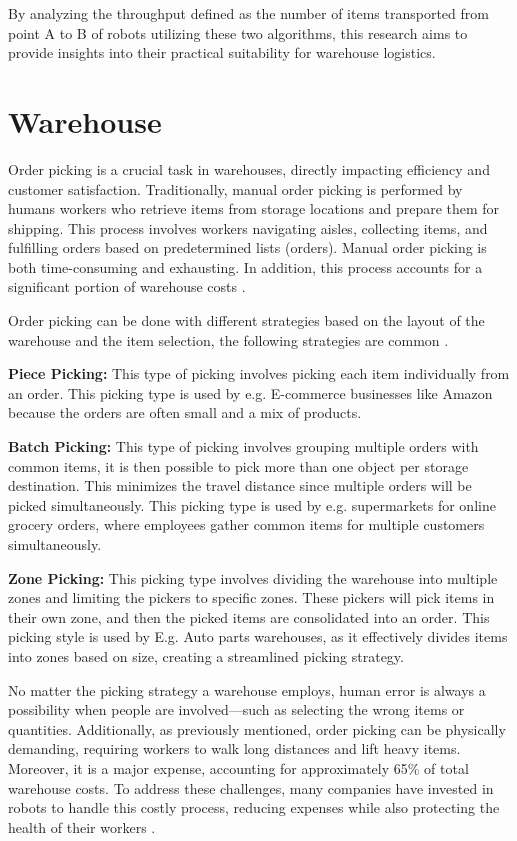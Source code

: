 \documentclass{kththesis}
\begin{document}
By analyzing the throughput defined as the number of items transported from point A to B of robots utilizing these two algorithms, this research aims to provide insights into their practical suitability for warehouse logistics.


\section{Warehouse}
Order picking is a crucial task in warehouses, directly impacting efficiency and customer satisfaction. Traditionally, manual order picking is performed by humans workers who retrieve items from storage locations and prepare them for shipping. This process involves workers navigating aisles, collecting items, and fulfilling orders based on predetermined lists (orders). Manual order picking is both time-consuming and exhausting. In addition, this process accounts for a significant portion of warehouse costs \parencite{Rene}.

Order picking can be done with different strategies based on the layout of the warehouse and the item selection, the following strategies are common \parencite{CognitOps}.

\textbf{Piece Picking:}
This type of picking involves picking each item individually from an order. This picking type is used by e.g. E-commerce businesses like Amazon because the orders are often small and a mix of products.

\textbf{Batch Picking:}
This type of picking involves grouping multiple orders with common items, it is then possible to pick more than one object per storage destination. This minimizes the travel distance since multiple orders will be picked simultaneously. This picking type is used by e.g. supermarkets for online grocery orders, where employees gather common items for multiple customers simultaneously.

\textbf{Zone Picking:}
This picking type involves dividing the warehouse into multiple zones and limiting the pickers to specific zones. These pickers will pick items in their own zone, and then the picked items are consolidated into an order. This picking style is used by E.g. Auto parts warehouses, as it effectively divides items into zones based on size, creating a streamlined picking strategy.

No matter the picking strategy a warehouse employs, human error is always a possibility when people are involved—such as selecting the wrong items or quantities. Additionally, as previously mentioned, order picking can be physically demanding, requiring workers to walk long distances and lift heavy items. Moreover, it is a major expense, accounting for approximately 65\% of total warehouse costs. To address these challenges, many companies have invested in robots to handle this costly process, reducing expenses while also protecting the health of their workers \parencite{Hung-Yu}.
\end{document}
